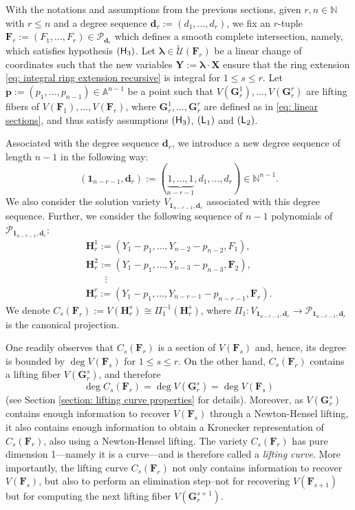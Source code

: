 \documentclass[pdflatex,sn-basic]{sn-jnl}%
\theoremstyle{thmstyleone}%
\theoremstyle{thmstyletwo}%
\theoremstyle{thmstylethree}%
\theoremstyle{definition}
\numberwithin{equation}{section}
\newcommand{\bfs}{\boldsymbol}
\newcommand{\N}{\mathbb N}
\newcommand{\A}{\mathbb A}
\begin{document}
With the notations and assumptions from the previous sections, given
$r,n\in\N$ with $r\le n$ and a degree sequence $\bfs
d_r:=(d_1,\ldots,d_r)$, we fix an $r$-tuple $\bfs
F_r:=(F_1,\ldots,F_r)\in \mathcal{P}_{\bfs d_r}$ which defines a
smooth complete intersection, namely, which satisfies hypothesis
$({\sf H}_3)$. Let $\bfs\lambda\in\mathcal{\widetilde{U}}(\bfs F_r)$
be a linear change of coordinates such that the new variables $\bfs
Y:=\bfs\lambda\cdot \bfs X$ ensure that the ring extension
\eqref{eq: integral ring extension recursive} is integral for $1\le
s\le r$. Let $\bfs p:=(p_1,\ldots,p_{n-1})\in\A^{n-1}$ be a point
such that $V(\bfs G_r^1),\ldots,V(\bfs G_r^r)$ are lifting fibers of
$V(\bfs F_1),\ldots,V(\bfs F_r)$, where $\bfs G_r^1,\ldots,\bfs
G_r^r$ are defined as in \eqref{eq: linear sections}, and thus
satisfy assumptions $({\sf H}_3)$, $({\sf L}_1)$ and $({\sf L}_2)$.

Associated with the degree sequence $\bfs d_r$, we introduce a new
degree sequence of length $n-1$ in the following way:
%
$$(\bfs 1_{n-r-1},\bfs
d_r):=(\underbrace{1,\ldots,1}_{n-r-1},d_1,\ldots,d_r)\in\N^{n-1}.$$
%
We also consider the solution variety $V_{\bfs 1_{n-r-1},\bfs d_r}$
associated with this degree sequence. Further, we consider the
following sequence of $n-1$ polynomials of $\mathcal{P}_{\bfs
1_{n-r-1},\bfs d_r}$:
%
$$
\begin{array}{l}
\bfs H_r^1:=(Y_1-p_1,\ldots,Y_{n-2}-p_{n-2},F_1), \\[1ex]
\bfs H_r^2:=(Y_1-p_1,\ldots,Y_{n-3}-p_{n-3},\bfs F_2), \\
 \qquad \vdots \\
\bfs H_r^r:=(Y_1-p_1,\ldots,Y_{n-r-1}-p_{n-r-1},\bfs F_r).
\end{array}
$$
%
We denote $C_s(\bfs F_r):=V(\bfs H_r^s)\cong \Pi_1^{-1}(\bfs
H_r^s)$, where $\Pi_1:V_{\bfs 1_{n-r-1},\bfs d_r}\to
\mathcal{P}_{\bfs 1_{n-r-1},\bfs d_r}$ is the canonical projection.

One readily observes that $C_s(\bfs F_r)$ is a section of $V(\bfs
F_s)$ and, hence, its degree is bounded by $\deg V(\bfs F_s)$ for
$1\le s\le r$. On the other hand, $C_s(\bfs F_r)$ contains a lifting
fiber $V(\bfs G_r^s)$, and therefore
%
$$\deg C_s(\bfs F_r)=\deg V(\bfs G_r^s)=\deg V(\bfs F_s)$$
%
(see Section \ref{section: lifting curve properties} for details).
Moreover, as $V(\bfs G_r^s)$ contains
enough information to recover $V(\bfs F_s)$ through a Newton-Hensel
lifting, it also contains enough information to obtain a Kronecker
representation of $C_s(\bfs F_r)$, also using a Newton-Hensel
lifting. The variety $C_s(\bfs F_r)$ has pure dimension 1---namely
it is a curve---and
is therefore called a {\em lifting curve}. More importantly, the
lifting curve $C_s(\bfs F_r)$ not only contains information to recover $V(\bfs
F_s)$, but also to perform an elimination step--not for recovering
$V(\bfs F_{s+1})$ but for computing the next lifting fiber $V(\bfs
G_r^{s+1})$.
\end{document}

